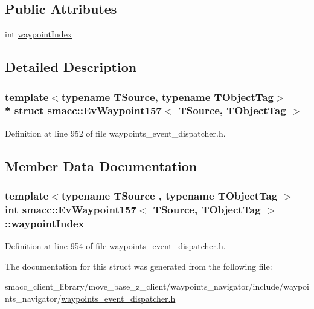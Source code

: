 \subsection*{Public Attributes}
\begin{DoxyCompactItemize}
\item 
int \hyperlink{structsmacc_1_1EvWaypoint157_a774a73a1e05ff77871d84e8d7d921a60}{waypoint\+Index}
\end{DoxyCompactItemize}


\subsection{Detailed Description}
\subsubsection*{template$<$typename T\+Source, typename T\+Object\+Tag$>$\\*
struct smacc\+::\+Ev\+Waypoint157$<$ T\+Source, T\+Object\+Tag $>$}



Definition at line 952 of file waypoints\+\_\+event\+\_\+dispatcher.\+h.



\subsection{Member Data Documentation}
\subsubsection[{\texorpdfstring{waypoint\+Index}{waypointIndex}}]{\setlength{\rightskip}{0pt plus 5cm}template$<$typename T\+Source , typename T\+Object\+Tag $>$ int {\bf smacc\+::\+Ev\+Waypoint157}$<$ T\+Source, T\+Object\+Tag $>$\+::waypoint\+Index}\hypertarget{structsmacc_1_1EvWaypoint157_a774a73a1e05ff77871d84e8d7d921a60}{}\label{structsmacc_1_1EvWaypoint157_a774a73a1e05ff77871d84e8d7d921a60}


Definition at line 954 of file waypoints\+\_\+event\+\_\+dispatcher.\+h.



The documentation for this struct was generated from the following file\+:\begin{DoxyCompactItemize}
\item 
smacc\+\_\+client\+\_\+library/move\+\_\+base\+\_\+z\+\_\+client/waypoints\+\_\+navigator/include/waypoints\+\_\+navigator/\hyperlink{waypoints__event__dispatcher_8h}{waypoints\+\_\+event\+\_\+dispatcher.\+h}\end{DoxyCompactItemize}

